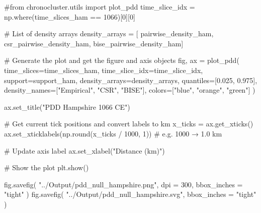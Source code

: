 \documentclass[
  11pt,
  letterpaper,
  DIV=11,
  numbers=noendperiod]{scrartcl}
\newenvironment{Shaded}{\begin{snugshade}}{\end{snugshade}}
\newcommand{\BuiltInTok}[1]{\textcolor[rgb]{0.00,0.23,0.31}{#1}}
\newcommand{\CommentTok}[1]{\textcolor[rgb]{0.37,0.37,0.37}{#1}}
\newcommand{\DecValTok}[1]{\textcolor[rgb]{0.68,0.00,0.00}{#1}}
\newcommand{\FloatTok}[1]{\textcolor[rgb]{0.68,0.00,0.00}{#1}}
\newcommand{\NormalTok}[1]{\textcolor[rgb]{0.00,0.23,0.31}{#1}}
\newcommand{\OperatorTok}[1]{\textcolor[rgb]{0.37,0.37,0.37}{#1}}
\newcommand{\StringTok}[1]{\textcolor[rgb]{0.13,0.47,0.30}{#1}}
\begin{document}
\begin{Shaded}
\begin{Highlighting}[]
\CommentTok{\#from chronocluster.utils import plot\_pdd}
\NormalTok{time\_slice\_idx }\OperatorTok{=}\NormalTok{ np.where(time\_slices\_ham }\OperatorTok{==} \DecValTok{1066}\NormalTok{)[}\DecValTok{0}\NormalTok{][}\DecValTok{0}\NormalTok{]}

\CommentTok{\# List of density arrays}
\NormalTok{density\_arrays }\OperatorTok{=}\NormalTok{ [}
\NormalTok{    pairwise\_density\_ham, }
\NormalTok{    csr\_pairwise\_density\_ham, }
\NormalTok{    bise\_pairwise\_density\_ham]}

\CommentTok{\# Generate the plot and get the figure and axis objects}
\NormalTok{fig, ax }\OperatorTok{=}\NormalTok{ plot\_pdd(}
\NormalTok{    time\_slices}\OperatorTok{=}\NormalTok{time\_slices\_ham,}
\NormalTok{    time\_slice\_idx}\OperatorTok{=}\NormalTok{time\_slice\_idx,}
\NormalTok{    support}\OperatorTok{=}\NormalTok{support\_ham,}
\NormalTok{    density\_arrays}\OperatorTok{=}\NormalTok{density\_arrays,}
\NormalTok{    quantiles}\OperatorTok{=}\NormalTok{[}\FloatTok{0.025}\NormalTok{, }\FloatTok{0.975}\NormalTok{],}
\NormalTok{    density\_names}\OperatorTok{=}\NormalTok{[}\StringTok{"Empirical"}\NormalTok{, }\StringTok{"CSR"}\NormalTok{, }\StringTok{"BISE"}\NormalTok{],}
\NormalTok{    colors}\OperatorTok{=}\NormalTok{[}\StringTok{"blue"}\NormalTok{, }\StringTok{"orange"}\NormalTok{, }\StringTok{"green"}\NormalTok{]}
\NormalTok{)}

\NormalTok{ax.set\_title(}\StringTok{"PDD Hampshire 1066 CE"}\NormalTok{)}

\CommentTok{\# Get current tick positions and convert labels to km}
\NormalTok{x\_ticks }\OperatorTok{=}\NormalTok{ ax.get\_xticks()}
\NormalTok{ax.set\_xticklabels(np.}\BuiltInTok{round}\NormalTok{(x\_ticks }\OperatorTok{/} \DecValTok{1000}\NormalTok{, }\DecValTok{1}\NormalTok{))  }\CommentTok{\# e.g. 1000 → 1.0 km}

\CommentTok{\# Update axis label}
\NormalTok{ax.set\_xlabel(}\StringTok{"Distance (km)"}\NormalTok{)}

\CommentTok{\# Show the plot}
\NormalTok{plt.show()}

\NormalTok{fig.savefig(}
    \StringTok{"../Output/pdd\_null\_hampshire.png"}\NormalTok{, }
\NormalTok{    dpi }\OperatorTok{=} \DecValTok{300}\NormalTok{, }
\NormalTok{    bbox\_inches }\OperatorTok{=} \StringTok{"tight"}
\NormalTok{)}
\NormalTok{fig.savefig(}
    \StringTok{"../Output/pdd\_null\_hampshire.svg"}\NormalTok{, }
\NormalTok{    bbox\_inches }\OperatorTok{=} \StringTok{"tight"}
\NormalTok{)}
\end{Highlighting}
\end{Shaded}
\end{document}
